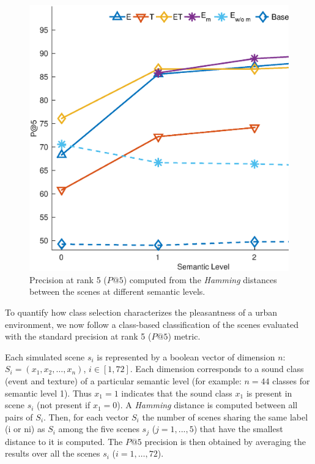 \documentclass[twoside,twocolumn]{article}
\begin{document}
\begin{figure}[t]
\begin{center}
\includegraphics[width=.4\paperwidth]{../gfxMatlab/pa5_1.eps}
\caption{\label{fig:pa5} Precision at rank 5 ($P@5$) computed from the \textit{Hamming} distances between the scenes at different semantic levels.}
\end{center}
\end{figure}

To quantify how class selection characterizes the pleasantness of a urban environment, we now follow a class-based classification of the scenes evaluated with the standard precision at rank 5 ($P@5$) metric. 

Each simulated scene $s_i$ is represented by a boolean vector of dimension $n$: $S_i = (x_1, x_2, \ldots{}, x_{n})$, $i\in[1,72]$. Each dimension corresponds to a sound class (event and texture) of a particular semantic level (for example: $n=44$ classes for semantic level 1). Thus $x_1 = 1$ indicates that the sound class $x_1$ is present in scene $s_i$ (not present if $x_1=0$). A \textit{Hamming} distance is computed between all pairs of $S_i$. Then, for each vector $S_i$ the number of scenes sharing the same label (i or ni) as $S_i$  among the five scenes $s_j$ ($j=1,...,5$) that have the smallest distance to it is computed. The $P@5$ precision is then obtained by averaging the results over all the scenes $s_i$ ($i=1, \ldots{}, 72$).
\end{document}
